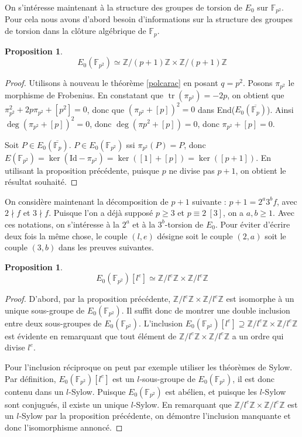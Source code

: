 \documentclass{article}
\theoremstyle{plain}%
\newtheorem{prop}[thm]{Proposition}
\theoremstyle{definition}%
\newcommand{\F}{\mathbb{F}}
\newcommand{\Z}{\mathbb{Z}}
\DeclareMathOperator{\tr}{tr}
\begin{document}
On s'intéresse maintenant à la structure des groupes de torsion de $E_0$ sur $\F_{p^2}$. Pour cela nous avons d'abord besoin d'informations sur la structure des groupes de torsion dans la clôture algébrique de $\F_{p}$.

\begin{prop}
  $$E_0(\F_{p^2}) \simeq \Z/(p+1)\Z \times \Z/(p+1)\Z$$
\end{prop}

\begin{proof}
  Utilisons à nouveau le théorème \ref{polcarac} en posant $q = p^2$. 
  Posons $\pi_{p^2}$ le morphisme de Frobenius.
  En constatant que $\tr(\pi_{p^2}) = -2p$, on obtient que $\pi_{p^2}^2 + 2p\pi_{p^2} + [p^2] = 0$, donc que $\left( \pi_{p^2} + [p] \right) ^2 = 0$ dans End($E_0(\overline{\F_p})$). 
  Ainsi $\deg(\pi_{p^2} + [p])^2 = 0$, donc $\deg(\pi{p^2} + [p]) = 0$, donc $\pi_{p^2} + [p] = 0$.

  Soit $P\in E_0(\overline{\F_{p}})$. $P \in E_0(\F_{p^2})$ ssi $\pi_{p^2}(P) = P$, donc $E(\F_{p^2}) = \ker(\text{Id} - \pi_{p^2}) = \ker([1] + [p]) = \ker([p+1])$.
  En utilisant la proposition précédente, puisque $p$ ne divise pas $p+1$, on obtient le résultat souhaité.
\end{proof}

On considère maintenant la décomposition de $p + 1$ suivante : $p + 1 = 2^a 3^b f$, avec $2 \nmid f$ et $3 \nmid f$. Puisque l'on a déjà supposé $p\ge 3$ et $p \equiv 2\ [3]$, on a $a, b\ge 1$. Avec ces notations, on s'intéresse à la $2^a$ et à la $3^b$-torsion de $E_0$. Pour éviter d'écrire deux fois la même chose, le couple $\left( l, e \right)$ désigne soit le couple $(2, a)$ soit le couple $(3, b)$ dans les preuves suivantes. 

\begin{prop}
  $$E_0(\F_{p^2})[l^e] \simeq \Z/l^e\Z \times \Z/l^e\Z$$
\end{prop}

\begin{proof}
  D'abord, par la proposition précédente, $\Z/l^e\Z \times \Z/l^e\Z$ est isomorphe à un unique sous-groupe de $E_0(\F_{p^2})$.
  Il suffit donc de montrer une double inclusion entre deux sous-groupes de $E_0(\F_{p^2})$.
  L'inclusion \allowbreak$E_0(\F_{p^2})[l^e] \supseteq \Z/l^e\Z \times \Z/l^e\Z$ est évidente en remarquant que tout élément de $\Z/l^e\Z \times \Z/l^e\Z$ a un ordre qui divise $l^e$.
  
  Pour l'inclusion réciproque on peut par exemple utiliser les théorèmes de Sylow. 
  Par définition, $E_0(\F_{p^2})[l^e]$ est un $l$-sous-groupe de $E_0(\F_{p^2})$, il est donc contenu dans un $l$-Sylow. 
  Puisque $E_0(\F_{p^2})$ est abélien, et puisque les $l$-Sylow sont conjugués, il existe un unique $l$-Sylow. 
  En remarquant que $\Z/l^e\Z \times \Z/l^e\Z$ est un $l$-Sylow par la proposition précédente, on démontre l'inclusion manquante et donc l'isomorphisme annoncé. 
\end{proof}
\end{document}
